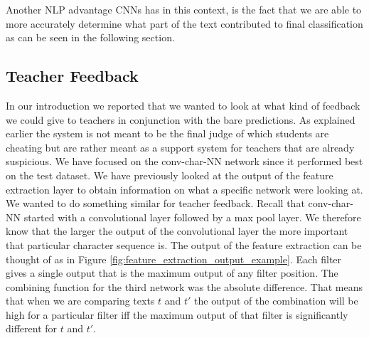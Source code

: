 Another \gls{NLP} advantage \gls{CNN}s has in this context, is the fact that
we are able to more accurately determine what part of the text contributed to
final classification as can be seen in the following section.


\subsection{Teacher Feedback}

In our introduction we reported that we wanted to look at what kind of feedback
we could give to teachers in conjunction with the bare predictions. As explained
earlier the system is not meant to be the final judge of which students are
cheating but are rather meant as a support system for teachers that are
already suspicious. We have focused on the \gls{conv-char-NN} network since it
performed best on the test dataset. We have previously looked at the output of
the feature extraction layer to obtain information on what a specific network
were looking at. We wanted to do something similar for teacher feedback.
Recall that \gls{conv-char-NN} started with a convolutional layer followed
by a max pool layer. We therefore know that the larger the output of the
convolutional layer the more important that particular character sequence
is. The output of the feature extraction can be thought of as in Figure
\ref{fig:feature_extraction_output_example}. Each filter gives a single output
that is the maximum output of any filter position. The combining function for
the third network was the absolute difference. That means that when we are
comparing texts $t$ and $t'$ the output of the combination will be high for
a particular filter iff the maximum output of that filter is significantly
different for $t$ and $t'$.

